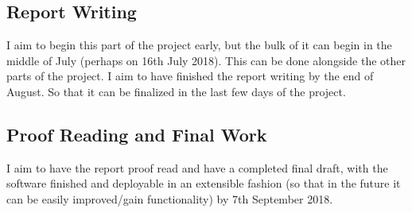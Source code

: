 \documentclass{article}
\begin{document}
\subsection{Report Writing}
I aim to begin this part of the project early, but the bulk of it can begin in the middle of July (perhaps on 16th July 2018). This can be done alongside the other parts of the project. I aim to have finished the report writing by the end of August. So that it can be finalized in the last few days of the project.

\subsection{Proof Reading and Final Work}
I aim to have the report proof read and have a completed final draft, with the software finished and deployable in an extensible fashion (so that in the future it can be easily improved/gain functionality) by 7th September 2018.
\end{document}
